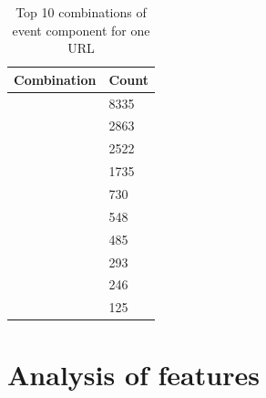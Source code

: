 \begin{table}
\begin{center}
{\renewcommand{\arraystretch}{1.5}
\begin{tabular}{| p{8cm} | p{2cm}|}
\hline
\textbf{Combination}	&	\textbf{Count}\\
\hline
['name']	&	8335\\
\hline
['location', 'name']	&	2863\\
\hline
['name', 'startDate']	&	2522\\
\hline
['location', 'name', 'startDate']	&	1735\\
\hline
['description', 'name']	&	730\\
\hline
['description', 'name', 'startDate']	&	548\\
\hline
['description', 'location', 'name']	&	485\\
\hline
['description', 'location', 'name', 'startDate']	&	293\\
\hline
['name', 'startDate', 'startDate']	&	246\\
\hline
['location', 'name', 'startDate', 'startDate']	&	125\\
\hline
\end{tabular}}
\caption{Top 10 combinations of event component for one URL}
\label{table:top10comb}
\end{center}
\end{table}	

\section{Analysis of features}

